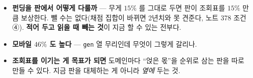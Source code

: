 \documentclass[11pt]{article}
\begin{document}
\begin{itemize}
\item \textbf{펀딩을 판에서 어떻게 다룰까} --- 무게 $15\%$ 를 그대로
두면 판이 조회표를 $15\%$ 만큼 보상한다. 뺄 수는 없다(채점 집합이
바뀌면 2년치와 못 견준다, 노트 378 조건 ④). \textbf{적어 두고 읽을
때 빼는 것}이 지금 할 수 있는 전부다.
\item \textbf{모바일 $46\%$ 도 높다} --- \texttt{gen} 열 무리인데 무엇이
그렇게 갈리나.
\item \textbf{조회표를 이기는 게 목표가 되면} 도메인마다 ``얹은 몫''을
순위로 삼는 판을 따로 만들 수 있다. 지금 판을 대체하는 게 아니라
\emph{옆에} 두는 것.
\end{itemize}
\end{document}
